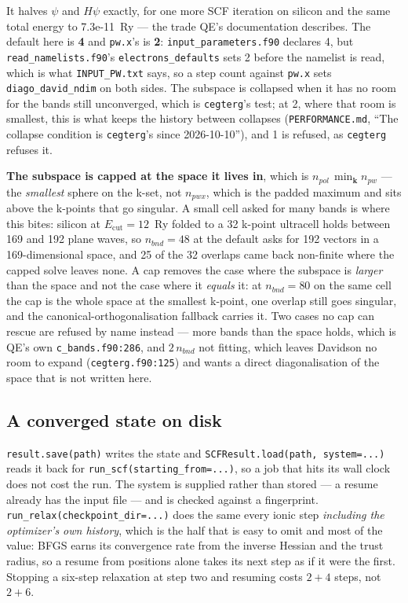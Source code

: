 \documentclass[11pt,a4paper]{article}
\newcommand{\code}[1]{\texttt{\small #1}}
\begin{document}
\noindent It halves $\psi$ and $H\psi$ exactly, for one more SCF iteration on
silicon and the same total energy to 7.3e-11~Ry --- the trade QE's
documentation describes. The default here is \textbf{4} and \code{pw.x}'s is
\textbf{2}: \code{input\_parameters.f90} declares 4, but
\code{read\_namelists.f90}'s \code{electrons\_defaults} sets 2 before the
namelist is read, which is what \code{INPUT\_PW.txt} says, so a step count
against \code{pw.x} sets \code{diago\_david\_ndim} on both sides. The subspace
is collapsed when it has no room for the bands still unconverged, which is
\code{cegterg}'s test; at 2, where that room is smallest, this is what keeps the
history between collapses (\code{PERFORMANCE.md}, ``The collapse condition is
\code{cegterg}'s since 2026-10-10''), and 1 is refused, as \code{cegterg}
refuses it.

\noindent \textbf{The subspace is capped at the space it lives in}, which is
$n_{pol}\,\min_{\mathbf k} n_{pw}$ --- the \emph{smallest} sphere on the k-set, not
$n_{pwx}$, which is the padded maximum and sits above the k-points that go
singular. A small cell asked for many bands is where this bites: silicon at
$E_{\mathrm{cut}}=12$~Ry folded to a 32 k-point ultracell holds between 169 and
192 plane waves, so $n_{bnd}=48$ at the default asks for 192 vectors in a
169-dimensional space, and 25 of the 32 overlaps came back non-finite where the
capped solve leaves none. A cap removes the case where the subspace is
\emph{larger} than the space and not the case where it \emph{equals} it: at
$n_{bnd}=80$ on the same cell the cap is the whole space at the smallest
k-point, one overlap still goes singular, and the canonical-orthogonalisation
fallback carries it. Two cases no cap can rescue are refused by name instead ---
more bands than the space holds, which is QE's own
\code{c\_bands.f90:286}, and $2\,n_{bnd}$ not fitting, which leaves Davidson no
room to expand (\code{cegterg.f90:125}) and wants a direct diagonalisation of
the space that is not written here.

\subsection*{A converged state on disk}

\code{result.save(path)} writes the state and \code{SCFResult.load(path,
system=...)} reads it back for \code{run\_scf(starting\_from=...)}, so a job
that hits its wall clock does not cost the run. The system is supplied rather
than stored --- a resume already has the input file --- and is checked against
a fingerprint. \code{run\_relax(checkpoint\_dir=...)} does the same every ionic
step \emph{including the optimizer's own history}, which is the half that is
easy to omit and most of the value: BFGS earns its convergence rate from the
inverse Hessian and the trust radius, so a resume from positions alone takes
its next step as if it were the first. Stopping a six-step relaxation at step
two and resuming costs $2+4$ steps, not $2+6$.
\end{document}

